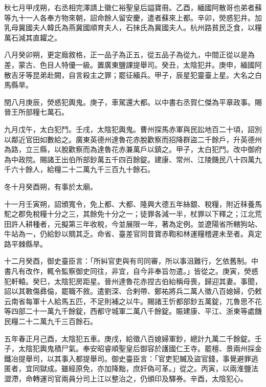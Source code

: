 \begin{pinyinscope}
 秋七月甲戌朔，右丞相完澤請上徽仁裕聖皇后謚寶冊。乙酉，緬國阿散哥也弟者蘇等九十一人各奉方物來朝，詔命餘人留安慶，遣者蘇來上都。辛卯，熒惑犯井。加乳母冀國夫人韓氏為燕冀國順育夫人，石抹氏為冀國夫人。杭州路貧民乏食，以糧萬石減其直糶之。



 八月癸卯朔，更定廕敘格，正一品子為正五，從五品子為從九，中間正從以是為差，蒙古、色目人特優一級。置廣東鹽課提舉司。癸丑，太陰犯井。庚申，緬國阿散吉牙等昆弟赴闕，自言殺主之罪；罷征緬兵。甲子，辰星犯靈臺上星。大名之白馬縣旱。



 閏八月庚辰，熒惑犯輿鬼。庚子，車駕還大都。以中書右丞賀仁傑為平章政事。賜晉王所部糧七萬石。



 九月戊午，太白犯鬥。壬戌，太陰犯輿鬼。曹州探馬赤軍與民訟地百二十頃，詔別以鄰近官田如數給之。廣東英德州達魯花赤脫歡察而招降群盜二千餘戶，升英德州為路，立三縣，以脫歡察而為達魯花赤兼萬戶以鎮之。甲子，太白犯鬥。改中御府為中政院。賜諸王出伯所部鈔萬五千四百餘錠。建康、常州、江陵饑民八十四萬九千六十餘人，給糧二十二萬九千三百九十餘石。



 冬十月癸酉朔，有事於太廟。



 十一月壬寅朔，詔頒寬令，免上都、大都、隆興大德五年絲銀、稅糧，附近秣養馬駝之郡免稅糧十分之三，其餘免十分之一；徒罪各減一半，杖罪以下釋之；江北荒田許人耕種者，元擬第三年收稅，今並展限一年，著為定例。並遼陽省所轄狗站、牛站為一，仍給鈔以賙其乏。命省、臺差官同昔寶赤鞫和林運糧稽遲未至者。真定路平棘縣旱。



 十二月癸酉，御史臺臣言：「所糾官吏與有司同審，所以事沮難行，乞依舊制。中書凡有改作，輒令監察御史同往，非宜，自今非奉旨勿遣。」皆從之。庚寅，熒惑犯軒轅。癸巳，太陰犯房距星。晉州達魯花赤捏古伯紿稱母喪，歸迎其妻。事聞，詔以其斁傷彞倫，罷職不敘。遣劉深、合剌帶、鄭祐將兵二萬人徵八百媳婦，仍敕云南省每軍十人給馬五匹，不足則補之以牛。賜諸王忻都部鈔五萬錠，兀魯思不花等四部二十一萬九千餘錠，西都守城軍二萬八千餘錠。賑建康、平江、浙東等處饑民糧二十二萬九千三百餘石。



 五年春正月己酉，太陰犯五車。庚戌，給徵八百媳婦軍鈔，總計九萬二千餘錠。壬子，太陰犯輿鬼積尸氣。奉安昭睿順聖皇后御容於護國仁王寺。罷檀、景兩州採金鐵冶提舉司，以其事入都提舉司。御史臺臣言：「官吏犯贓及盜官錢，事覺避罪逃匿者，宜同獄成。雖經原免，亦加降黜，庶奸偽可革。」從之。丙寅，以兩淮鹽法澀滯，命轉運司官兩員分司上江以整治之，仍頒印及驛券。辛酉，太陰犯心。




\end{pinyinscope}
